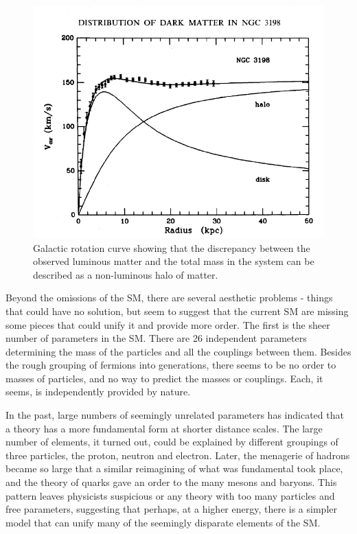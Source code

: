 \begin{centering}
\begin{figure}[bth]
\myfloatalign
\includegraphics[width=.85\linewidth]{figures/theory/rotatioanl_curve_ngc3198_rc.png}
\caption{Galactic rotation curve showing that the discrepancy between the observed luminous matter and the total mass in the system can be described as a non-luminous halo of matter. \cite{1985ApJ...295..305V}}
\label{fig:dm_curve}
\end{figure}
\end{centering}

Beyond the omissions of the \ac{SM}, there are several aesthetic problems - things that could have no solution, but seem to suggest that the current \ac{SM} are missing some pieces that could unify it and provide more order. The first is the sheer number of parameters in the \ac{SM}. There are 26 independent parameters determining the mass of the particles and all the couplings between them. Besides the rough grouping of fermions into generations, there seems to be no order to masses of particles, and no way to predict the masses or couplings. Each, it seems, is independently provided by nature. 

In the past, large numbers of seemingly unrelated parameters has indicated that a theory has a more fundamental form at shorter distance scales. The large number of elements, it turned out, could be explained by different groupings of three particles, the proton, neutron and electron. Later, the menagerie of hadrons became so large that a similar reimagining of what was fundamental took place, and the theory of quarks gave an order to the many mesons and baryons. This pattern leaves physicists suspicious or any theory with too many particles and free parameters, suggesting that perhaps, at a higher energy, there is a simpler model that can unify many of the seemingly disparate elements of the \ac{SM}. 

